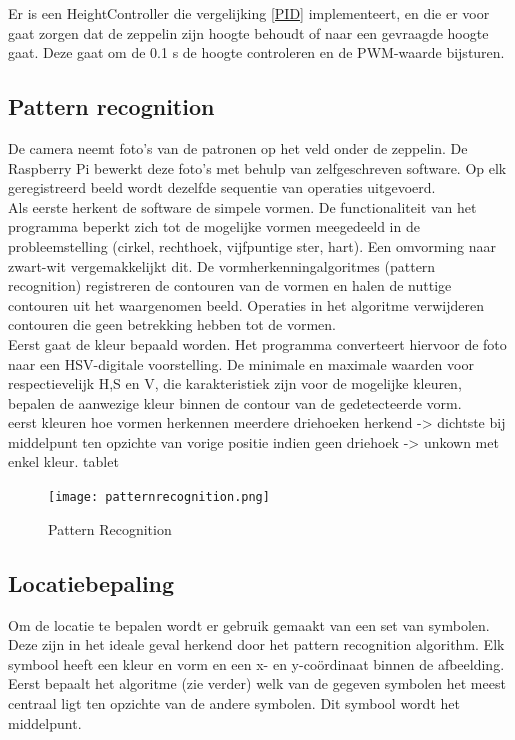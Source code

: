 \documentclass[eind]{penoverslag}
\begin{document}
Er is een HeightController die vergelijking \eqref{PID} implementeert, en die er voor gaat zorgen dat de zeppelin zijn hoogte behoudt of naar een gevraagde hoogte gaat. Deze gaat om de 0.1 s de hoogte controleren en de PWM-waarde bijsturen. \\



\subsection{Pattern recognition}
De camera neemt foto’s van de patronen op het veld onder de zeppelin. De Raspberry Pi bewerkt deze foto’s met behulp van zelfgeschreven software. Op elk geregistreerd beeld wordt dezelfde sequentie van operaties uitgevoerd. \\
Als eerste herkent de software de simpele vormen. De functionaliteit van het programma beperkt zich tot de mogelijke vormen meegedeeld in de probleemstelling (cirkel, rechthoek, vijfpuntige ster, hart). Een omvorming naar zwart-wit vergemakkelijkt dit. De vormherkenningalgoritmes (pattern recognition) registreren de contouren van de vormen en halen de nuttige contouren uit het waargenomen beeld. Operaties in het algoritme verwijderen contouren die geen betrekking hebben tot de vormen. \\

Eerst gaat de kleur bepaald worden. Het programma converteert hiervoor de foto naar een HSV-digitale voorstelling. De minimale en maximale waarden voor respectievelijk H,S en V, die karakteristiek zijn voor de mogelijke kleuren, bepalen de aanwezige kleur binnen de contour van de gedetecteerde vorm. \\
eerst kleuren 
hoe vormen herkennen
meerdere driehoeken herkend -> dichtste bij middelpunt
ten opzichte van vorige positie
indien geen driehoek -> unkown met enkel kleur.
tablet

\begin{figure}[H]
\begin{center}
\texttt{[image: patternrecognition.png]}
\end{center}
\caption{Pattern Recognition}
\label{Patterns}
\end{figure}

\subsection{Locatiebepaling}
Om de locatie te bepalen wordt er gebruik gemaakt van een set van symbolen. Deze zijn in het ideale geval herkend door het pattern recognition algorithm. Elk symbool heeft een kleur en vorm en een x- en y-coördinaat binnen de afbeelding. Eerst bepaalt het algoritme (zie verder) welk van de gegeven symbolen het meest centraal ligt ten opzichte van de andere symbolen. Dit symbool wordt het middelpunt.\\
\end{document}
